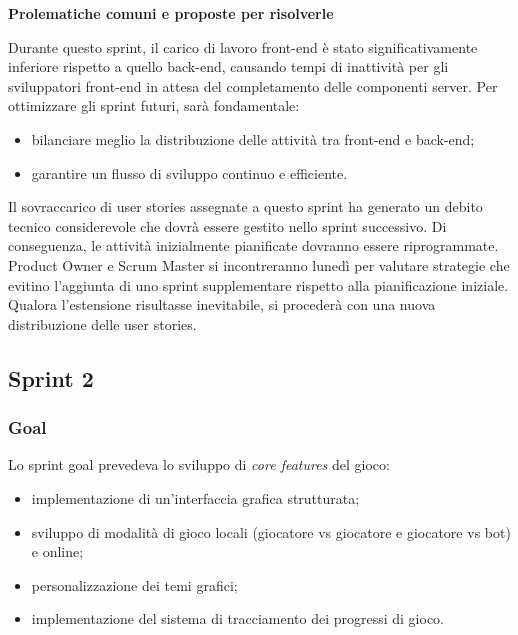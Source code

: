 \documentclass{article}
\begin{document}
\noindent
\textbf{Prolematiche comuni e proposte per risolverle}

    Durante questo sprint, il carico di lavoro front-end è stato significativamente inferiore rispetto a quello back-end,
    causando tempi di inattività per gli sviluppatori front-end in attesa del completamento delle componenti server.
    Per ottimizzare gli sprint futuri, sarà fondamentale:
    \begin{itemize}

        \item bilanciare meglio la distribuzione delle attività tra front-end e back-end;
        \item garantire un flusso di sviluppo continuo e efficiente.

    \end{itemize}
    Il sovraccarico di user stories assegnate a questo sprint ha generato un debito tecnico considerevole che dovrà essere gestito
    nello sprint successivo. Di conseguenza, le attività inizialmente pianificate dovranno essere riprogrammate.
    Product Owner e Scrum Master si incontreranno lunedì per valutare strategie che evitino l'aggiunta di uno sprint
    supplementare rispetto alla pianificazione iniziale.
    Qualora l'estensione risultasse inevitabile, si procederà con una nuova distribuzione delle user stories.

\subsection{Sprint 2}

\subsubsection{Goal}
Lo sprint goal prevedeva lo sviluppo di \textit{core features} del gioco:
\begin{itemize}
    \item implementazione di un'interfaccia grafica strutturata;
    \item sviluppo di modalità di gioco locali (giocatore vs giocatore e giocatore vs bot) e online;
    \item personalizzazione dei temi grafici;
    \item implementazione del sistema di tracciamento dei progressi di gioco.
\end{itemize}
\end{document}
